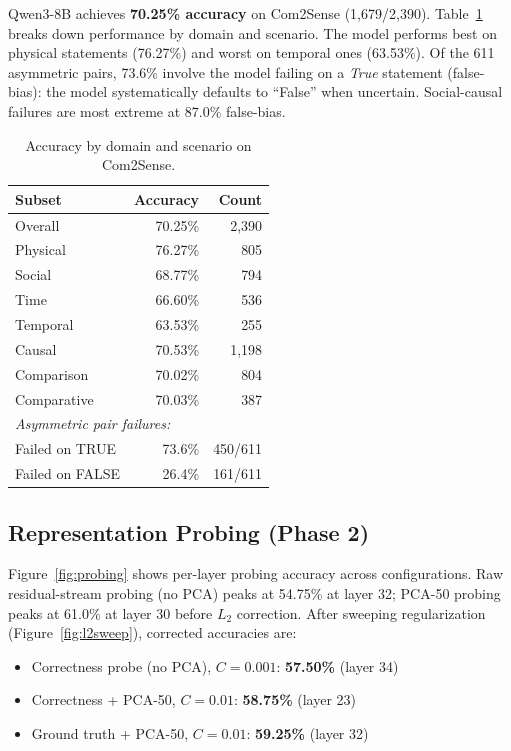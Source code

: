 \documentclass{article}
\begin{document}
Qwen3-8B achieves \textbf{70.25\% accuracy} on Com2Sense (1,679/2,390). Table~\ref{tab:accuracy} breaks down performance by domain and scenario. The model performs best on physical statements (76.27\%) and worst on temporal ones (63.53\%). Of the 611 asymmetric pairs, 73.6\% involve the model failing on a \emph{True} statement (false-bias): the model systematically defaults to ``False'' when uncertain. Social-causal failures are most extreme at 87.0\% false-bias.

\begin{table}[t]
\centering
\small
\caption{Accuracy by domain and scenario on Com2Sense.}
\label{tab:accuracy}
\begin{tabular}{lrr}
\toprule
\textbf{Subset} & \textbf{Accuracy} & \textbf{Count} \\
\midrule
Overall & 70.25\% & 2,390 \\
\midrule
Physical & 76.27\% & 805 \\
Social & 68.77\% & 794 \\
Time & 66.60\% & 536 \\
Temporal & 63.53\% & 255 \\
\midrule
Causal & 70.53\% & 1,198 \\
Comparison & 70.02\% & 804 \\
Comparative & 70.03\% & 387 \\
\midrule
\multicolumn{3}{l}{\textit{Asymmetric pair failures:}} \\
Failed on TRUE & 73.6\% & 450/611 \\
Failed on FALSE & 26.4\% & 161/611 \\
\bottomrule
\end{tabular}
\end{table}

\subsection{Representation Probing (Phase 2)}

Figure~\ref{fig:probing} shows per-layer probing accuracy across configurations. Raw residual-stream probing (no PCA) peaks at 54.75\% at layer 32; PCA-50 probing peaks at 61.0\% at layer 30 before $L_2$ correction. After sweeping regularization (Figure~\ref{fig:l2sweep}), corrected accuracies are:

\begin{itemize}
    \item Correctness probe (no PCA), $C=0.001$: \textbf{57.50\%} (layer 34)
    \item Correctness + PCA-50, $C=0.01$: \textbf{58.75\%} (layer 23)
    \item Ground truth + PCA-50, $C=0.01$: \textbf{59.25\%} (layer 32)
\end{itemize}
\end{document}
